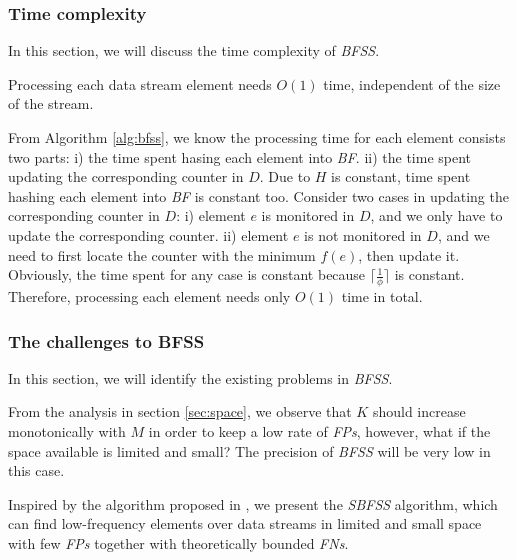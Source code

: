 \documentclass[conference]{IEEEtran}
\begin{document}
\subsubsection{\textbf{Time complexity}}
In this section, we will discuss the time complexity of \emph{BFSS}.

\begin{theorem}\label{thm:5}
Processing each data stream element needs $O(1)$ time, independent of the size of the stream.
\end{theorem}

\begin{IEEEproof}
From Algorithm \ref{alg:bfss}, we know the processing time for each element consists two parts: i) the time spent hasing each element into \emph{BF}. ii) the time spent updating the corresponding counter in $D$. Due to $H$ is constant, time spent hashing each element into \emph{BF} is constant too. Consider two cases in updating the corresponding counter in $D$: i) element $e$ is monitored in $D$, and we only have to update the corresponding counter. ii) element $e$ is not monitored in $D$, and we need to first locate the counter with the minimum $f(e)$, then update it. Obviously, the time spent for any case is constant because $\lceil \frac{1}{\phi}\rceil$ is constant. Therefore, processing each element needs only $O(1)$ time in total.
\end{IEEEproof}

\subsubsection{\textbf{The challenges to BFSS}}
In this section, we will identify the existing problems in \emph{BFSS}.\par
From the analysis in section \ref{sec:space}, we observe that $K$ should increase monotonically with $M$ in order to keep a low rate of \emph{FPs}, however, what if the space available is limited and small? The precision of \emph{BFSS} will be very low in this case.\par
Inspired by the algorithm proposed in \cite{IEEEexample:sbf}, we present the \emph{SBFSS} algorithm, which can find low-frequency elements over data streams in limited and small space with few \emph{FPs} together with theoretically bounded \emph{FNs}.\par
\end{document}
